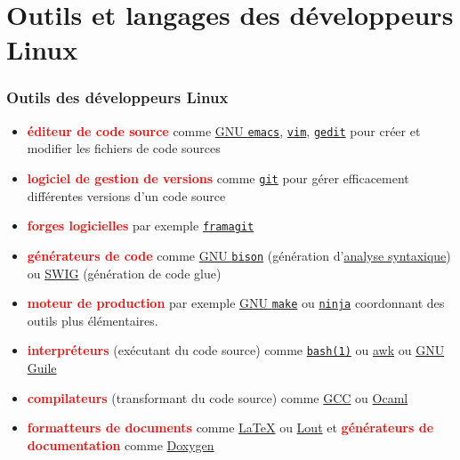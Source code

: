 \documentclass[xcolor=svgnames,final,smaller,a4]{beamer}
\begin{document}
\section{Outils et langages des développeurs Linux}

\begin{frame}
  \frametitle{Outils des développeurs Linux}

  \begin{relsize}{-1}
  \begin{itemize}

  \item  \textbf{\textcolor{red}{éditeur de code source}} comme \href{https://www.gnu.org/software/emacs/}{GNU \texttt{emacs}},
    \href{https://vim.org/}{\texttt{vim}}, \href{https://help.gnome.org/users/gedit/}{\texttt{gedit}} pour créer et modifier les fichiers de code sources


  \item  \textbf{\textcolor{red}{logiciel de gestion de versions}} comme \href{https://fr.wikipedia.org/wiki/Git}{\texttt{git}} pour gérer efficacement différentes versions d'un code source
\
\item  \textbf{\textcolor{red}{forges logicielles}} par exemple  \href{https://framagit.org/}{\texttt{framagit}}

  \item  \textbf{\textcolor{red}{générateurs de code}} comme
    \href{https://fr.wikipedia.org/wiki/GNU\_Bison}{GNU
      \texttt{bison}} (génération
    d'\href{https://fr.wikipedia.org/wiki/Analyse_syntaxique}{analyse
      syntaxique}) ou \href{https://fr.wikipedia.org/wiki/SWIG}{SWIG}
    (génération de code glue)
   
  \item  \textbf{\textcolor{red}{moteur de production}} par exemple \href{https://fr.wikipedia.org/wiki/Make}{GNU \texttt{make}} ou \href{https://ninja-build.org}{\texttt{ninja}} coordonnant des outils plus élémentaires.
  \item \textbf{\textcolor{red}{interpréteurs}} (exécutant du code
    source) comme
    \href{https://man7.org/linux/man-pages/man1/bash.1.html}{\texttt{bash(1)}}
    ou \href{https://fr.wikipedia.org/wiki/Awk}{awk} ou
    \href{https://fr.wikipedia.org/wiki/GNU_Guile}{GNU Guile}
  \item  \textbf{\textcolor{red}{compilateurs}} (transformant du code source) comme \href{http://gcc.gnu.org/}{GCC} ou \href{http://ocaml.org/}{Ocaml}
  \item \textbf{\textcolor{red}{formatteurs de documents}} comme
    \href{https://fr.wikipedia.org/wiki/LaTeX}{\LaTeX} ou
    \href{https://fr.wikipedia.org/wiki/Lout}{Lout} et  \textbf{\textcolor{red}{générateurs de documentation}}
    comme \href{https://fr.wikipedia.org/wiki/Doxygen}{Doxygen}



\end{itemize}
\end{relsize}
\end{frame}
\end{document}
